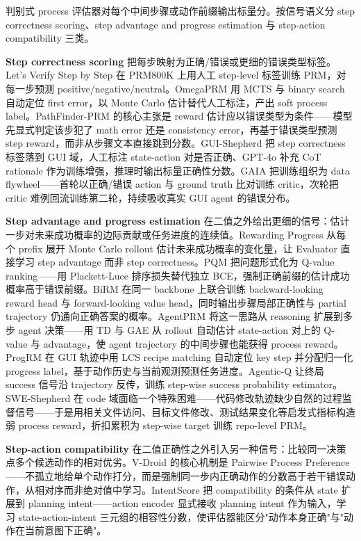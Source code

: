 判别式 process 评估器对每个中间步骤或动作前缀输出标量分。按信号语义分 step correctness scoring、step advantage and progress estimation 与 step-action compatibility 三类。

\textbf{Step correctness scoring} 把每步映射为正确/错误或更细的错误类型标签。Let's Verify Step by Step \cite{Lig23} 在 PRM800K 上用人工 step-level 标签训练 PRM，对每一步预测 positive/negative/neutral。OmegaPRM \cite{Luo24} 用 MCTS 与 binary search 自动定位 first error，以 Monte Carlo 估计替代人工标注，产出 soft process label。PathFinder-PRM \cite{Pal25} 的核心主张是 reward 估计应以错误类型为条件——模型先显式判定该步犯了 math error 还是 consistency error，再基于错误类型预测 step reward，而非从步骤文本直接跳到分数。GUI-Shepherd \cite{Che25h} 把 step correctness 标签落到 GUI 域，人工标注 state-action 对是否正确、GPT-4o 补充 CoT rationale 作为训练增强，推理时输出标量正确性分数。GAIA \cite{Wan26p} 把训练组织为 data flywheel——首轮以正确/错误 action 与 ground truth 比对训练 critic，次轮把 critic 难例回流训练第二轮，持续吸收真实 GUI agent 的错误分布。

\textbf{Step advantage and progress estimation} 在二值之外给出更细的信号：估计一步对未来成功概率的边际贡献或任务进度的连续值。Rewarding Progress \cite{Set24} 从每个 prefix 展开 Monte Carlo rollout 估计未来成功概率的变化量，让 Evaluator 直接学习 step advantage 而非 step correctness。PQM \cite{Li24m} 把问题形式化为 Q-value ranking——用 Plackett-Luce 排序损失替代独立 BCE，强制正确前缀的估计成功概率高于错误前缀。BiRM \cite{Che25s} 在同一 backbone 上联合训练 backward-looking reward head 与 forward-looking value head，同时输出步骤局部正确性与 partial trajectory 仍通向正确答案的概率。AgentPRM \cite{Xi25b} 将这一思路从 reasoning 扩展到多步 agent 决策——用 TD 与 GAE 从 rollout 自动估计 state-action 对上的 Q-value 与 advantage，使 agent trajectory 的中间步骤也能获得 process reward。ProgRM \cite{Zha25z} 在 GUI 轨迹中用 LCS recipe matching 自动定位 key step 并分配归一化 progress label，基于动作历史与当前观测预测任务进度。Agentic-Q \cite{Wan26s} 让终局 success 信号沿 trajectory 反传，训练 step-wise success probability estimator。SWE-Shepherd \cite{Dih26} 在 code 域面临一个特殊困难——代码修改轨迹缺少自然的过程监督信号——于是用相关文件访问、目标文件修改、测试结果变化等启发式指标构造弱 process reward，折扣累积为 step-wise target 训练 repo-level PRM。

\textbf{Step-action compatibility} 在二值正确性之外引入另一种信号：比较同一决策点多个候选动作的相对优劣。V-Droid \cite{Dai25} 的核心机制是 Pairwise Process Preference——不孤立地给单个动作打分，而是强制同一步内正确动作的分数高于若干错误动作，从相对序而非绝对值中学习。IntentScore \cite{Che26s} 把 compatibility 的条件从 state 扩展到 planning intent——action encoder 显式接收 planning intent 作为输入，学习 state-action-intent 三元组的相容性分数，使评估器能区分"动作本身正确"与"动作在当前意图下正确"。

